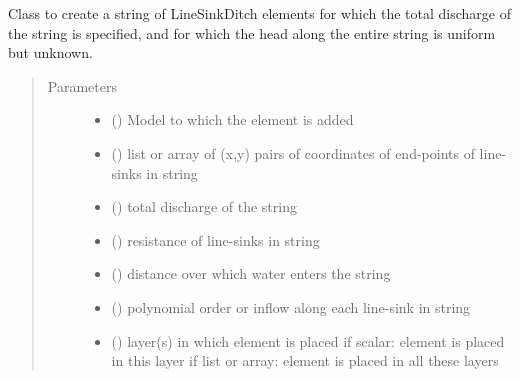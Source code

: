 \documentclass[letterpaper,10pt,english]{sphinxmanual}
\begin{document}
\begin{fulllineitems}
\label{\detokenize{linesinks/linesinkditchstring:timml.linesink.LineSinkDitchString}}
Class to create a string of LineSinkDitch elements for which the
total discharge of the string is specified, and for which the head
along the entire string is uniform but unknown.
\begin{quote}\begin{description}
\item[{Parameters}] \leavevmode\begin{itemize}
\item {} 
 () \textendash{} Model to which the element is added

\item {} 
 () \textendash{} list or array of (x,y) pairs of coordinates of end-points of
line-sinks in string

\item {} 
 () \textendash{} total discharge of the string

\item {} 
 (\sphinxstyleliteralemphasis{ (}\sphinxstyleliteralemphasis{)}) \textendash{} resistance of line-sinks in string

\item {} 
 () \textendash{} distance over which water enters the string

\item {} 
 (\sphinxstyleliteralemphasis{ (}\sphinxstyleliteralemphasis{)}) \textendash{} polynomial order or inflow along each line-sink in string

\item {} 
 (\sphinxstyleliteralemphasis{, }) \textendash{} layer(s) in which element is placed
if scalar: element is placed in this layer
if list or array: element is placed in all these layers


\end{itemize}
\end{description}
\end{quote}
\end{fulllineitems}
\end{document}
